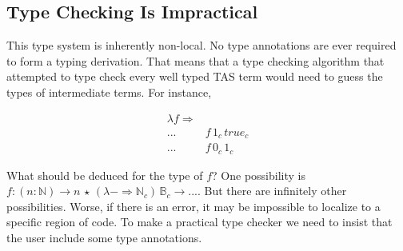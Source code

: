  
 
 
 
 
\subsection{Type Checking Is Impractical}
 
This type system is inherently non-local.
No type annotations are ever required to form a typing derivation.
That means that a type checking algorithm that attempted to type check every well typed \ac{TAS} term would need to guess the types of intermediate terms.
For instance,
 
\begin{align*}
\lambda f\Rightarrow & \,\\
... & f\,1_{c}\,true_{c}\\
... & f\,0_{c}\,1_{c}
\end{align*}

What should be deduced for the type of $f$? One possibility is $f:\left(n:\mathbb{N}\right)\rightarrow n\,\star\,\left(\lambda-\Rightarrow\mathbb{N}_{c}\right)\,\mathbb{B}_{c}\rightarrow...$.
But there are infinitely other possibilities.
Worse, if there is an error, it may be impossible to localize to a specific region of code.
To make a practical type checker we need to insist that the user include some type annotations.